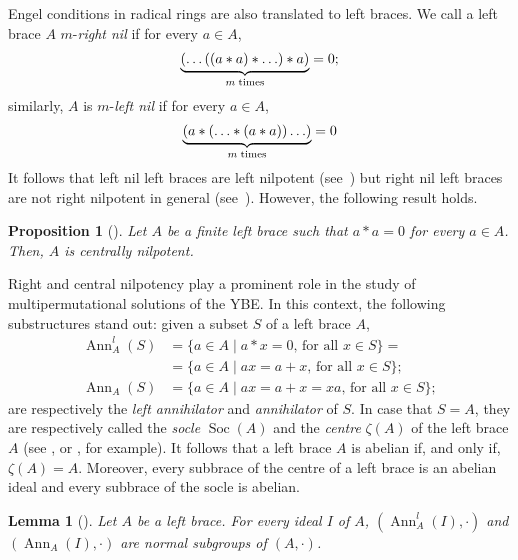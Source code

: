 \documentclass[12pt, a4paper, english]{article}
\newtheorem{lema}[teorema]{Lemma}
\newtheorem{proposicio}[teorema]{Proposition}
\theoremstyle{definition}
\DeclareMathOperator{\Ann}{Ann}
\DeclareMathOperator{\Soc}{Soc}
\begin{document}
Engel conditions in radical rings are also translated to left braces. We call a left brace $A$ $m$-\emph{right nil} if for every $a\in A$,
\[ \begin{array}{c}
\underbrace{(\ldots((a\ast a)\ast \ldots )\ast a)}_{m\;\textnormal{times}}=0;
\end{array}
\]
similarly, $A$ is $m$-\emph{left nil} if for every $a\in A$, \[
\begin{array}{c}
\underbrace{(a\ast(\ldots \ast(a\ast a))\ldots )}_{m\;\textnormal{times}}=0 
\end{array}
\] 
It follows that left nil left braces are left nilpotent (see~\cite{Smoktunowicz18-jalg}) but right nil left braces are not right nilpotent in general (see~\cite{BallesterFerraraPerezCTrombetti23-arXiv-note}). However, the following result holds.
\begin{proposicio}[\cite{BallesterFerraraPerezCTrombetti23-arXiv-note}]
\label{prop:2-nil->centnil}
Let $A$ be a finite left brace such that $a \ast a = 0$ for every $a\in A$. Then, $A$ is centrally nilpotent.
\end{proposicio}

Right and central nilpotency play a prominent role in the study of multipermutational solutions of the YBE. In this context, the following substructures stand out: given a subset $S$ of a left brace $A$,
\begin{align*}
\Ann_A^l(S) & = \{a \in A \mid a \ast x = 0,\, \text{for all $x\in S$}\} = \\
& =\{a \in A \mid ax = a+x,\,\text{for all $x\in S$}\};\\
\Ann_A(S) &  =\{a \in A \mid ax = a+x = xa,\,\text{for all $x\in S$} \};
\end{align*}
are respectively the \emph{left annihilator} and \emph{annihilator} of $S$. In case that $S = A$, they are respectively called the \emph{socle} $\Soc(A)$ and the \emph{centre} $\zeta(A)$ of the left brace $A$ (see \cite{BonattoJedlicka23}, \cite{CatinoColazzoStefanelli19} or \cite{CedoSmoktunowiczVendramin19}, for example). It follows that a left brace $A$ is abelian if, and only if, $\zeta(A) = A$. Moreover, every subbrace of the centre of a left brace is an abelian ideal and every subbrace of the socle is abelian.

\begin{lema}[\cite{BallesterEstebanKurdachenkoPerezC-dedekind-leftbraces}]
\label{lema:left-right-ann_substruct}
Let $A$ be a left brace. For every ideal $I$ of $A$, $(\Ann_A^l(I),\cdot)$ and $(\Ann_A(I), \cdot)$ are normal subgroups of $(A,\cdot)$.
\end{lema}
\end{document}
